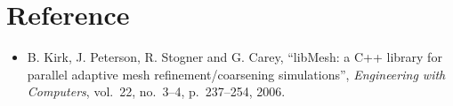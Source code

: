 \section*{Reference}
\begin{frame}[t]
  \begin{block}{}
    \begin{itemize}
    \item{
      B. Kirk, J. Peterson, R. Stogner and G. Carey, ``libMesh: a C++
      library for parallel adaptive mesh refinement/coarsening
      simulations'',  \emph{Engineering with Computers}, vol.~22, no.~3--4, p.~237--254, 2006.
      }
    \end{itemize}
  \end{block}
\end{frame}


